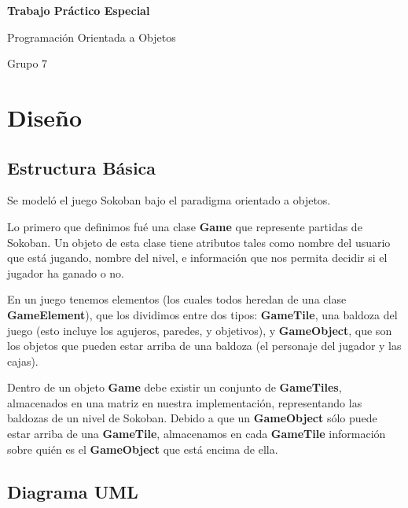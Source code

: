 \documentclass[a4paper,12pt,titlepage]{article}
\begin{document}
\begin{center}

\begin{huge}
	\textbf{Trabajo Práctico Especial} 
\end{huge}

\vspace{20pt}

\begin{Huge}
	Programación Orientada a Objetos
\end{Huge}

\vspace{12pt}

\begin{large}
	Grupo 7
\end{large}

\end{center}

\section{Diseño}

\subsection{Estructura Básica}

Se modeló el juego Sokoban bajo el paradigma orientado a objetos.

Lo primero que definimos fué una clase \textbf{Game} que represente partidas de Sokoban. Un objeto de esta clase tiene atributos tales como nombre del usuario que está jugando, nombre del nivel, e información que nos permita decidir si el jugador ha ganado o no.

En un juego tenemos elementos (los cuales todos heredan de una clase \textbf{GameElement}), que los dividimos entre dos tipos: \textbf{GameTile}, una baldoza del juego (esto incluye los agujeros, paredes, y objetivos), y \textbf{GameObject}, que son los objetos que pueden estar arriba de una baldoza (el personaje del jugador y las cajas).

Dentro de un objeto \textbf{Game} debe existir un conjunto de \textbf{GameTiles}, almacenados en una matriz en nuestra implementación, representando las baldozas de un nivel de Sokoban. Debido a que un \textbf{GameObject} sólo puede estar arriba de una \textbf{GameTile}, almacenamos en cada \textbf{GameTile} información sobre quién es el \textbf{GameObject} que está encima de ella.

\newpage
\subsection{Diagrama UML}
\end{document}
